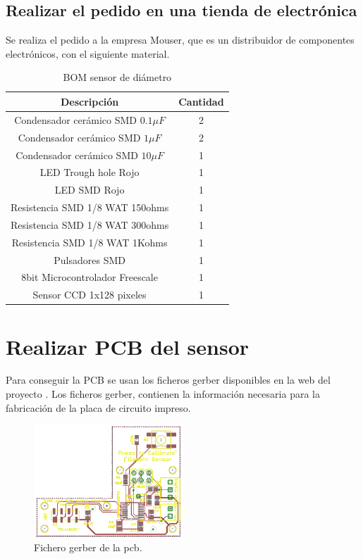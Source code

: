 \subsection{Realizar el pedido en una tienda de electrónica}

Se realiza el pedido a la empresa Mouser, que es un distribuidor de componentes electrónicos, con el siguiente material.

\begin{table}[H]
\centering
\begin{tabular}{cc}
{\bf Descripción}                 & {\bf Cantidad} \\ \hline
Condensador cerámico SMD $0.1 \mu F$ & 2              \\
Condensador cerámico SMD $1 \mu F$   & 2              \\
Condensador cerámico SMD $10 \mu F$  & 1              \\
LED Trough hole Rojo             & 1              \\
LED SMD Rojo                     & 1              \\
Resistencia SMD 1/8 WAT 150ohms  & 1              \\
Resistencia SMD 1/8 WAT 300ohms  & 1              \\
Resistencia SMD 1/8 WAT 1Kohms   & 1              \\
Pulsadores SMD                   & 1              \\
8bit Microcontrolador Freescale  & 1              \\
Sensor CCD 1x128 pixeles         & 1             
\end{tabular}
\caption{BOM sensor de diámetro}
\label{tab:BOM}
\end{table}

\section{Realizar PCB del sensor}

Para conseguir la PCB se usan los ficheros gerber disponibles en la web del proyecto \cite{thing_filamento}. Los ficheros gerber, contienen la información necesaria para la fabricación de la placa de circuito impreso.

   \begin{figure}[H]
            \centering
            \includegraphics[width=0.5\textwidth]{images/sensor/gerber.png}
            \caption{Fichero gerber de la pcb.}
            \label{fig:sens_gerber}
    \end{figure}

